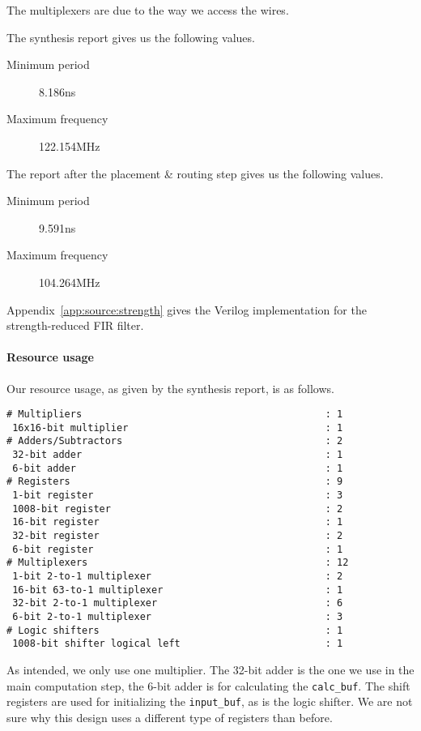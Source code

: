 The multiplexers are due to the way we access the wires.

The synthesis report gives us the following values.
\begin{description}
	\item[Minimum period] 8.186ns
	\item[Maximum frequency] 122.154MHz
\end{description}

The report after the placement \& routing step gives us the following values.
\begin{description}
	\item[Minimum period] 9.591ns
	\item[Maximum frequency] 104.264MHz
\end{description}

\strengthfilter
Appendix~\ref{app:source:strength} gives the Verilog implementation for the strength-reduced FIR filter.

\paragraph{Resource usage}
Our resource usage, as given by the synthesis report, is as follows.

\begin{verbatim}
# Multipliers                                          : 1
 16x16-bit multiplier                                  : 1
# Adders/Subtractors                                   : 2
 32-bit adder                                          : 1
 6-bit adder                                           : 1
# Registers                                            : 9
 1-bit register                                        : 3
 1008-bit register                                     : 2
 16-bit register                                       : 1
 32-bit register                                       : 2
 6-bit register                                        : 1
# Multiplexers                                         : 12
 1-bit 2-to-1 multiplexer                              : 2
 16-bit 63-to-1 multiplexer                            : 1
 32-bit 2-to-1 multiplexer                             : 6
 6-bit 2-to-1 multiplexer                              : 3
# Logic shifters                                       : 1
 1008-bit shifter logical left                         : 1
\end{verbatim}

As intended, we only use one multiplier.
The 32-bit adder is the one we use in the main computation step, the 6-bit adder is for calculating the \texttt{calc\_buf}.
The shift registers are used for initializing the \texttt{input\_buf}, as is the logic shifter.
We are not sure why this design uses a different type of registers than before.

